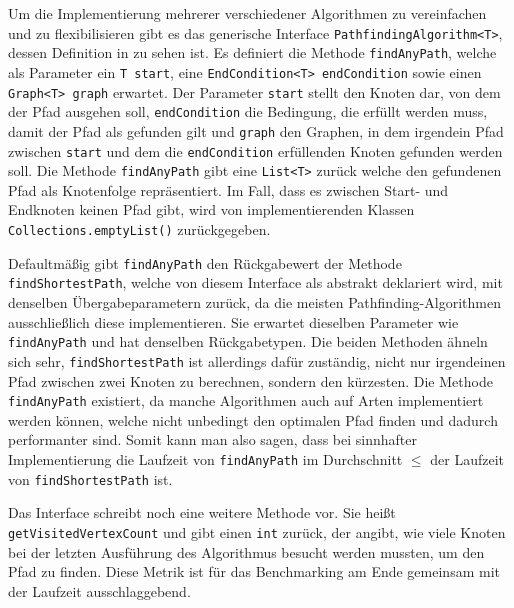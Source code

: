                 Um die Implementierung mehrerer verschiedener Algorithmen zu vereinfachen und zu flexibilisieren gibt es das generische Interface \lstinline{PathfindingAlgorithm<T>}, dessen Definition in  zu sehen ist. Es definiert die Methode \lstinline{findAnyPath}, welche als Parameter ein \lstinline{T start}, eine \lstinline{EndCondition<T> endCondition} sowie einen \lstinline{Graph<T> graph} erwartet. Der Parameter \lstinline{start} stellt den Knoten dar, von dem der Pfad ausgehen soll, \lstinline{endCondition} die Bedingung, die erfüllt werden muss, damit der Pfad als gefunden gilt und \lstinline{graph} den Graphen, in dem irgendein Pfad zwischen \lstinline{start} und dem die \lstinline{endCondition} erfüllenden Knoten gefunden werden soll. Die Methode \lstinline{findAnyPath} gibt eine \lstinline{List<T>} zurück welche den gefundenen Pfad als Knotenfolge repräsentiert. Im Fall, dass es zwischen Start- und Endknoten keinen Pfad gibt, wird von implementierenden Klassen \lstinline{Collections.emptyList()} zurückgegeben.
                
                Defaultmäßig gibt \lstinline{findAnyPath} den Rückgabewert der Methode \lstinline{findShortestPath}, welche von diesem Interface als abstrakt deklariert wird, mit denselben Übergabeparametern zurück, da die meisten Pathfinding-Algorithmen ausschließlich diese implementieren. Sie erwartet dieselben Parameter wie \lstinline{findAnyPath} und hat denselben Rückgabetypen. Die beiden Methoden ähneln sich sehr, \lstinline{findShortestPath} ist allerdings dafür zuständig, nicht nur irgendeinen Pfad zwischen zwei Knoten zu berechnen, sondern den kürzesten. Die Methode \lstinline{findAnyPath} existiert, da manche Algorithmen auch auf Arten implementiert werden können, welche nicht unbedingt den optimalen Pfad finden und dadurch performanter sind. Somit kann man also sagen, dass bei sinnhafter Implementierung die Laufzeit von \lstinline{findAnyPath} im Durchschnitt $\leq$ der Laufzeit von \lstinline{findShortestPath} ist.

                Das Interface schreibt noch eine weitere Methode vor. Sie heißt \lstinline{getVisitedVertexCount} und gibt einen \lstinline{int} zurück, der angibt, wie viele Knoten bei der letzten Ausführung des Algorithmus besucht werden mussten, um den Pfad zu finden. Diese Metrik ist für das Benchmarking am Ende gemeinsam mit der Laufzeit ausschlaggebend.
        
                

